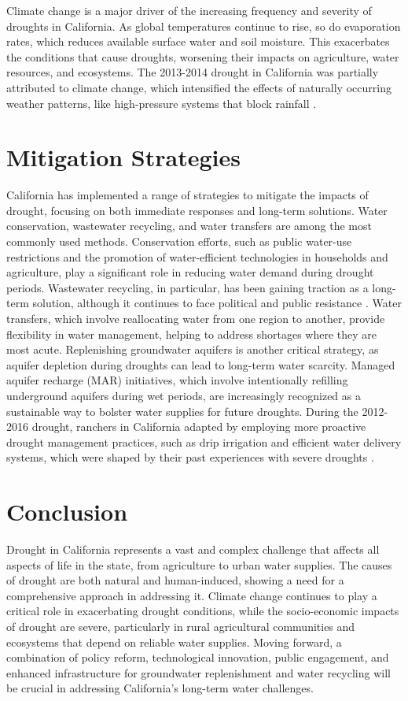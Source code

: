 \documentclass[
]{book}
\theoremstyle{definition}
\theoremstyle{definition}
\theoremstyle{definition}
\theoremstyle{definition}
\theoremstyle{remark}
\begin{document}
Climate change is a major driver of the increasing frequency and severity of droughts in California. As global temperatures continue to rise, so do evaporation rates, which reduces available surface water and soil moisture. This exacerbates the conditions that cause droughts, worsening their impacts on agriculture, water resources, and ecosystems. The 2013-2014 drought in California was partially attributed to climate change, which intensified the effects of naturally occurring weather patterns, like high-pressure systems that block rainfall \citep{mao2015}.

\section{Mitigation Strategies}\label{mitigation-strategies}

California has implemented a range of strategies to mitigate the impacts of drought, focusing on both immediate responses and long-term solutions. Water conservation, wastewater recycling, and water transfers are among the most commonly used methods. Conservation efforts, such as public water-use restrictions and the promotion of water-efficient technologies in households and agriculture, play a significant role in reducing water demand during drought periods. Wastewater recycling, in particular, has been gaining traction as a long-term solution, although it continues to face political and public resistance \citep{keavney2022}. Water transfers, which involve reallocating water from one region to another, provide flexibility in water management, helping to address shortages where they are most acute. Replenishing groundwater aquifers is another critical strategy, as aquifer depletion during droughts can lead to long-term water scarcity. Managed aquifer recharge (MAR) initiatives, which involve intentionally refilling underground aquifers during wet periods, are increasingly recognized as a sustainable way to bolster water supplies for future droughts. During the 2012-2016 drought, ranchers in California adapted by employing more proactive drought management practices, such as drip irrigation and efficient water delivery systems, which were shaped by their past experiences with severe droughts \citep{woodmansee2021}.

\section{Conclusion}\label{conclusion-1}

Drought in California represents a vast and complex challenge that affects all aspects of life in the state, from agriculture to urban water supplies. The causes of drought are both natural and human-induced, showing a need for a comprehensive approach in addressing it. Climate change continues to play a critical role in exacerbating drought conditions, while the socio-economic impacts of drought are severe, particularly in rural agricultural communities and ecosystems that depend on reliable water supplies. Moving forward, a combination of policy reform, technological innovation, public engagement, and enhanced infrastructure for groundwater replenishment and water recycling will be crucial in addressing California's long-term water challenges.
\end{document}
